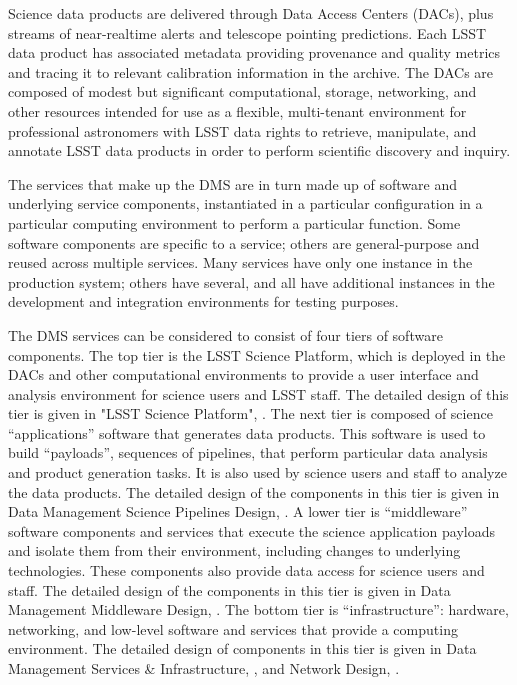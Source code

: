 \documentclass[DM,lsstdraft,toc]{lsstdoc}
\begin{document}
Science data products are delivered through Data Access Centers (DACs),
plus streams of near-realtime alerts and telescope pointing predictions.
Each LSST data product has associated metadata providing provenance and
quality metrics and tracing it to relevant calibration information in
the archive. The DACs are composed of modest but significant
computational, storage, networking, and other resources intended for use
as a flexible, multi-tenant environment for professional astronomers
with LSST data rights to retrieve, manipulate, and annotate LSST data
products in order to perform scientific discovery and inquiry.

The services that make up the DMS are in turn made up of software and
underlying service components, instantiated in a particular
configuration in a particular computing environment to perform a
particular function. Some software components are specific to a service;
others are general-purpose and reused across multiple services. Many
services have only one instance in the production system; others have
several, and all have additional instances in the development and
integration environments for testing purposes.

The DMS services can be considered to consist of four tiers of software
components. The top tier is the LSST Science Platform, which is deployed
in the DACs and other computational environments to provide a user
interface and analysis environment for science users and LSST staff. The
detailed design of this tier is given in "LSST Science Platform", . The next
tier is composed of science ``applications'' software that generates
data products. This software is used to build ``payloads'', sequences of
pipelines, that perform particular data analysis and product generation
tasks. It is also used by science users and staff to analyze the data
products. The detailed design of the components in this tier is given in
Data Management Science Pipelines Design, . A lower tier is
``middleware'' software components and services that execute the science
application payloads and isolate them from their environment, including
changes to underlying technologies. These components also provide data
access for science users and staff. The detailed design of the
components in this tier is given in Data Management Middleware Design,
. The bottom tier is ``infrastructure'': hardware, networking,
and low-level software and services that provide a computing
environment. The detailed design of components in this tier is given in
Data Management Services \& Infrastructure, , and Network Design,
.
\end{document}
